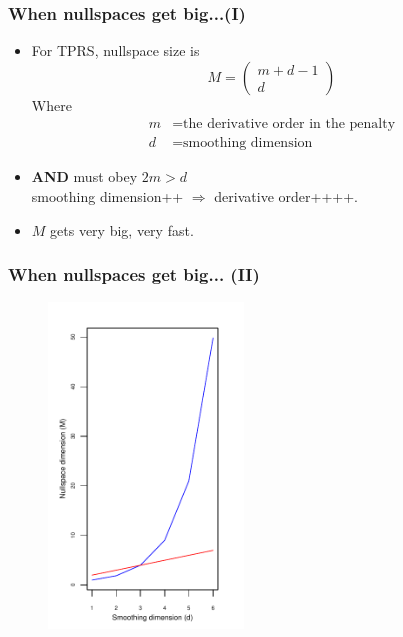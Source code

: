 \documentclass[ignorenonframetext]{beamer} %
\newcommand{\bi}{\begin{itemize}}
\newcommand{\ei}{\end{itemize}}
\begin{document}
\begin{frame}
	\frametitle{When nullspaces get big...(I)}
	\bi
		\item For TPRS, nullspace size is 
		\begin{equation*}
			M=\begin{pmatrix} m+d-1 \\ d  \end{pmatrix}
		\end{equation*}
		Where \begin{align*}
				m &= \text{the derivative order in the penalty}\\
				d &= \text{smoothing dimension}
			\end{align*}
		\item \textbf{AND} must obey $2m>d$ \\smoothing dimension++ $\Rightarrow$ derivative order++++.
		\item $M$ gets very big, very fast.
	\ei
\end{frame}

\begin{frame}
	\frametitle{When nullspaces get big... (II)}
	\begin{figure}
	\centering
			\includegraphics[height=3.4in]{figs/nullspace-dim.pdf} 
	\end{figure}
\end{frame}

\end{document}

